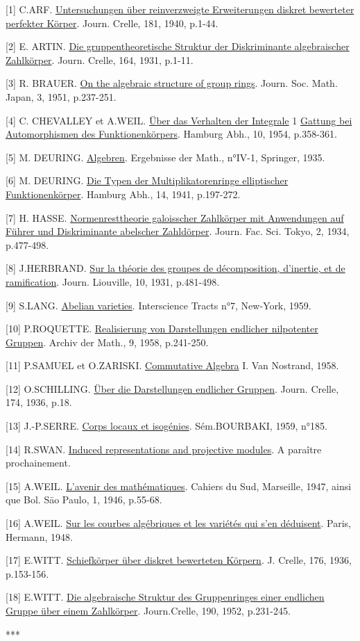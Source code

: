 \begin{center}\end{center}

[1] C.ARF. \uline{Untersuchungen über reinverzweigte Erweiterungen diskret bewerteter perfekter Körper}. Journ. Crelle, 181, 1940, p.1-44.

[2] E. ARTIN. \uline{Die gruppentheoretische Struktur der Diskriminante algebraischer Zahlkörper}. Journ. Crelle, 164, 1931, p.1-11.

[3] R. BRAUER. \uline{On the algebraic structure of group rings}. Journ. Soc. Math. Japan, 3, 1951, p.237-251.

[4] C. CHEVALLEY et A.WEIL. \uline{Über das Verhalten der Integrale} 1 \uline{Gattung bei Automorphismen des Funktionenkörpers}. Hamburg Abh., 10, 1954, p.358-361.

[5] M. DEURING. \uline{Algebren}. Ergebnisse der Math., n°IV-1, Springer, 1935.

[6] M. DEURING. \uline{Die Typen der Multiplikatorenringe elliptischer Funktionenkörper}. Hamburg Abh., 14, 1941, p.197-272.

[7] H. HASSE. \uline{Normenresttheorie galoisscher Zahlkörper mit Anwendungen auf Führer und Diskriminante abelscher Zahldörper}. Journ. Fac. Sci. Tokyo, 2, 1934, p.477-498.

[8] J.HERBRAND. \uline{Sur la théorie des groupes de décomposition, d'inertie, et de ramification}. Journ. Liouville, 10, 1931, p.481-498.

[9] S.LANG. \uline{Abelian varieties}. Interscience Tracts n°7, New-York, 1959.

[10] P.ROQUETTE. \uline{Realisierung von Darstellungen endlicher nilpotenter Gruppen}. Archiv der Math., 9, 1958, p.241-250.

[11] P.SAMUEL et O.ZARISKI. \uline{Commutative Algebra} I. Van Nostrand, 1958.

[12] O.SCHILLING. \uline{Über die Darstellungen endlicher Gruppen}. Journ. Crelle, 174, 1936, p.18.

[13] J.-P.SERRE. \uline{Corps locaux et isogénies}. Sém.BOURBAKI, 1959, n°185.

[14] R.SWAN. \uline{Induced representations and projective modules}. A paraître prochainement.

[15] A.WEIL. \uline{L'avenir des mathématiques}. Cahiers du Sud, Marseille, 1947, ainsi que Bol. S\={a}o Paulo, 1, 1946, p.55-68.

[16] A.WEIL. \uline{Sur les courbes algébriques et les variétés qui s'en déduisent}. Paris, Hermann, 1948.

[17] E.WITT. \uline{Schiefkörper über diskret bewerteten Körpern}. J. Crelle, 176, 1936, p.153-156.

[18] E.WITT. \uline{Die algebraische Struktur des Gruppenringes einer endlichen Gruppe über einem Zahlkörper}. Journ.Crelle, 190, 1952, p.231-245.

\begin{center}***\end{center}
